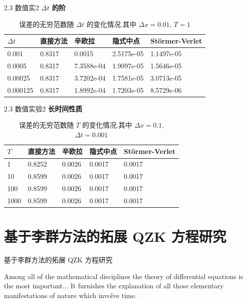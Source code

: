 \documentclass{beamer}
\begin{document}
\begin{frame}{2.3 数值实2}
\textbf{$\Delta t$ 的阶}

\begin{table}[h]
  \centering
\caption{误差的无穷范数随 $\Delta t$ 的变化情况.其中 $\Delta x=0.01$, $T=1$}
\begin{tabularx}{\linewidth}{XXXXX}
 \hline
 $\Delta t$ &直接方法 & 辛欧拉 & 隐式中点 & St\"{o}rmer-Verlet\\
 \hline
 0.001 & 0.8317 & 0.0015 & 2.5175e-05 & 1.1497e-05 \\
 0.0005 & 0.8317 & 7.3588e-04 & 1.9097e-05 & 1.5646e-05 \\
 0.00025 & 0.8317 & 3.7202e-04 & 1.7581e-05 & 3.0713e-05 \\
 0.000125 & 0.8317 & 1.8992e-04 & 1.7203e-05 & 8.5729e-06 \\
 \hline
\end{tabularx}
  \label{tab:dt3}
\end{table}
\end{frame}

\begin{frame}{2.3 数值实验2}
\textbf{长时间性质}

\begin{table}[h]
  \centering
\caption{误差的无穷范数随 $T$ 的变化情况.其中 $\Delta x=0.1$, $\Delta t=0.001$}
\begin{tabularx}{\linewidth}{XXXXX}
 \hline
 $T$ &直接方法 & 辛欧拉 & 隐式中点 & St\"{o}rmer-Verlet\\
 \hline
 1 & 0.8252 & 0.0026 & 0.0017 & 0.0017 \\
 10 & 0.8599 & 0.0026 & 0.0017 & 0.0017 \\
 100 & 0.8599 & 0.0026 & 0.0017 & 0.0017 \\
 1000 & 0.8599 & 0.0026 & 0.0017 & 0.0017 \\
 \hline
\end{tabularx}
  \label{tab:t3}
\end{table}
\end{frame}

\section{基于李群方法的拓展 QZK 方程研究}
\begin{frame}{基于李群方法的拓展 QZK 方程研究}
\begin{exampleblock}{}
\qquad Among all of the mathematical disciplines the theory of differential equations is the most important... It furnishes the explanation of all those elementary manifestations of nature which involve time.
\end{exampleblock}
\end{frame}
\end{document}
